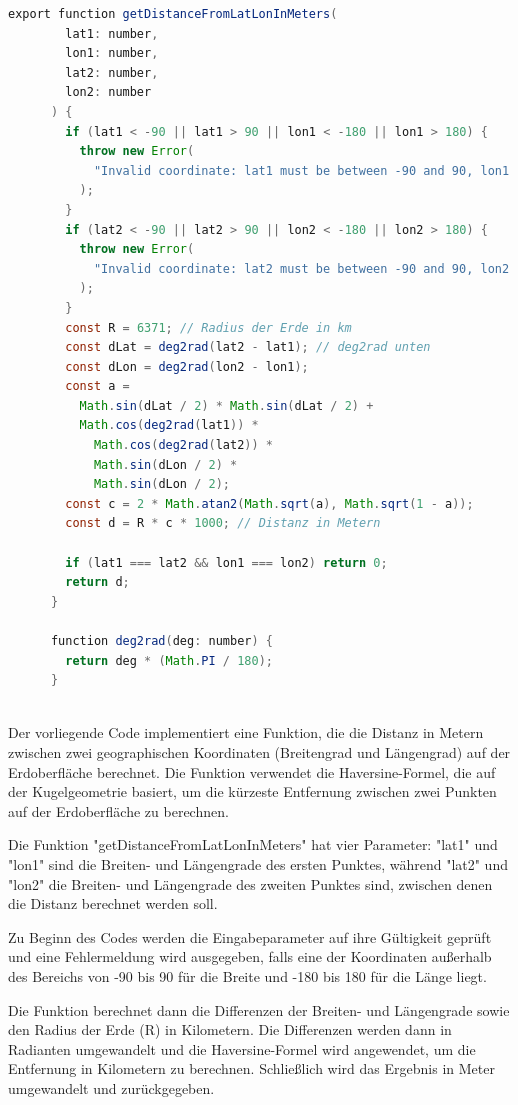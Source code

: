 \begin{lstlisting}[language=Java,caption=getDistanceFromLatLonInMeters Funktion]
    export function getDistanceFromLatLonInMeters(
        lat1: number,
        lon1: number,
        lat2: number,
        lon2: number
      ) {
        if (lat1 < -90 || lat1 > 90 || lon1 < -180 || lon1 > 180) {
          throw new Error(
            "Invalid coordinate: lat1 must be between -90 and 90, lon1 must be between -180 and 180"
          );
        }
        if (lat2 < -90 || lat2 > 90 || lon2 < -180 || lon2 > 180) {
          throw new Error(
            "Invalid coordinate: lat2 must be between -90 and 90, lon2 must be between -180 and 180"
          );
        }
        const R = 6371; // Radius der Erde in km
        const dLat = deg2rad(lat2 - lat1); // deg2rad unten
        const dLon = deg2rad(lon2 - lon1);
        const a =
          Math.sin(dLat / 2) * Math.sin(dLat / 2) +
          Math.cos(deg2rad(lat1)) *
            Math.cos(deg2rad(lat2)) *
            Math.sin(dLon / 2) *
            Math.sin(dLon / 2);
        const c = 2 * Math.atan2(Math.sqrt(a), Math.sqrt(1 - a));
        const d = R * c * 1000; // Distanz in Metern
      
        if (lat1 === lat2 && lon1 === lon2) return 0;
        return d;
      }
      
      function deg2rad(deg: number) {
        return deg * (Math.PI / 180);
      }
      
\end{lstlisting}
Der vorliegende Code implementiert eine Funktion, die die Distanz in Metern zwischen zwei geographischen Koordinaten (Breitengrad und Längengrad) auf der Erdoberfläche berechnet. Die Funktion verwendet die Haversine-Formel, die auf der Kugelgeometrie basiert, um die kürzeste Entfernung zwischen zwei Punkten auf der Erdoberfläche zu berechnen.

Die Funktion "getDistanceFromLatLonInMeters" hat vier Parameter: "lat1" und "lon1" sind die Breiten- und Längengrade des ersten Punktes, während "lat2" und "lon2" die Breiten- und Längengrade des zweiten Punktes sind, zwischen denen die Distanz berechnet werden soll.

Zu Beginn des Codes werden die Eingabeparameter auf ihre Gültigkeit geprüft und eine Fehlermeldung wird ausgegeben, falls eine der Koordinaten außerhalb des Bereichs von -90 bis 90 für die Breite und -180 bis 180 für die Länge liegt.

Die Funktion berechnet dann die Differenzen der Breiten- und Längengrade sowie den Radius der Erde (R) in Kilometern. Die Differenzen werden dann in Radianten umgewandelt und die Haversine-Formel wird angewendet, um die Entfernung in Kilometern zu berechnen. Schließlich wird das Ergebnis in Meter umgewandelt und zurückgegeben.

